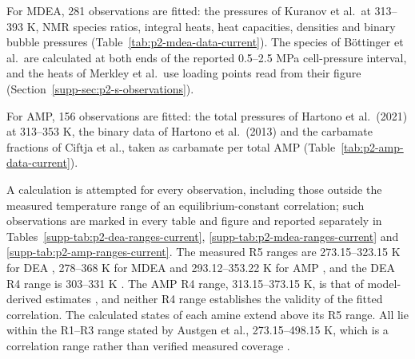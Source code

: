 For MDEA, 281 observations are fitted: the pressures of Kuranov et al.\ at 313--393 K, NMR species ratios, integral heats, heat capacities, densities and binary bubble pressures (Table~\ref{tab:p2-mdea-data-current}).
The species of B\"ottinger et al.\ are calculated at both ends of the reported 0.5--2.5 MPa cell-pressure interval, and the heats of Merkley et al.\ use loading points read from their figure (Section~\ref{supp-sec:p2-s-observations}).



For AMP, 156 observations are fitted: the total pressures of Hartono et al.\ (2021) at 313--353 K, the binary data of Hartono et al.\ (2013) and the carbamate fractions of Ciftja et al., taken as carbamate per total AMP (Table~\ref{tab:p2-amp-data-current}).



A calculation is attempted for every observation, including those outside the measured temperature range of an equilibrium-constant correlation; such observations are marked in every table and figure and reported separately in Tables~\ref{supp-tab:p2-dea-ranges-current}, \ref{supp-tab:p2-mdea-ranges-current} and \ref{supp-tab:p2-amp-ranges-current}.
The measured R5 ranges are 273.15--323.15 K for DEA \cite[Sect.~2, p.~71; Eq.~7, p.~73]{bowerAcidicDissociationConstant1962}, 278--368 K for MDEA \cite{perez-saladokampsDissociationConstantNMethyldiethanolamine1996} and 293.12--353.22 K for AMP \cite[Table~16]{hamborgDissociationConstantsThermodynamic2009}, and the DEA R4 range is 303--331 K \cite[experimental procedure, p.~692; Table~3 and Eq.~14, p.~695]{arouaTemperatureDependencyEquilibrium1997}.
The AMP R4 range, 313.15--373.15 K, is that of model-derived estimates \cite[Table~2, Eqs.~7--11]{xuRepresentationEquilibriumSolubility1992}, and neither R4 range establishes the validity of the fitted correlation.
The calculated states of each amine extend above its R5 range.
All lie within the R1--R3 range stated by Austgen et al., 273.15--498.15 K, which is a correlation range rather than verified measured coverage \cite[Table~V, p.~547]{Austgen1991}.

